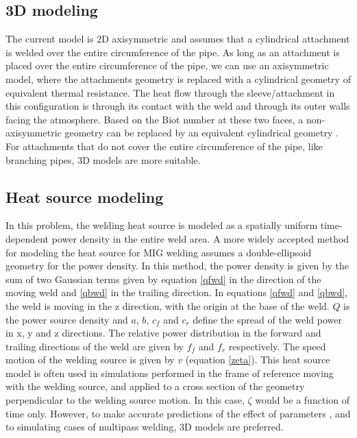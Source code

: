 \documentclass{article}
\makeatletter
\newcommand{\autocitel}[1]{\autocite{#1}\checknextarg}
\newcommand{\checknextarg}{\@ifnextchar\bgroup{\gobblenextarg}{}}
\newcommand{\gobblenextarg}[1]{$^,$\autocite{#1}\@ifnextchar\bgroup{\gobblenextarg}{}}
\makeatother
\begin{document}
\subsection{3D modeling}
 The current model is 2D axisymmetric and assumes that a cylindrical attachment is welded over the entire circumference of the pipe. As long as an attachment is placed over the entire circumference of the pipe, we can use an axisymmetric model, where the attachments geometry is replaced with a cylindrical geometry of equivalent thermal resistance. The heat flow through the sleeve/attachment in this configuration is through its contact with the weld and through its outer walls facing the atmosphere. Based on the Biot number at these two faces, a non-axisymmetric geometry can be replaced by an equivalent cylindrical geometry \autocitel{fisher1996efficient}. For attachments that do not cover the entire circumference of the pipe, like branching pipes, 3D models are more suitable\autocitel{xue2007numerical}.   


\subsection{Heat source modeling}
 In this problem, the welding heat source is modeled as a spatially uniform time-dependent power density in the entire weld area. A more widely accepted method for modeling the heat source for MIG welding assumes a double-ellipsoid geometry for the power density\autocitel{goldak1984new}. In this method, the power density is given by the sum of two Gaussian terms given by equation \ref{qfwd} in the direction of the moving weld and \ref{qbwd} in the trailing direction. In equations \ref{qfwd} and \ref{qbwd}, the weld is moving in the z direction, with the origin at the base of the weld. $Q$ is the power source density and $a$, $b$, $c_f$ and $c_r$ define the spread of the weld power in x, y and z directions. The relative power distribution in the forward and trailing directions of the weld are given by $f_f$ and $f_r$ respectively. The speed motion of the welding source is given by $v$ (equation \ref{zeta}). This heat source model is often used in simulations performed in the frame of reference moving with the welding source, and applied to a cross section of the geometry perpendicular to the welding source motion\autocitel{lindgren2006numerical}. In this case, $\zeta$ would be a function of time only. However, to make accurate predictions of the effect of parameters \autocitel{gery2005effects}, and to simulating cases of multipass welding\autocitel{deng2006numerical}, 3D models are preferred.
 
\end{document}
